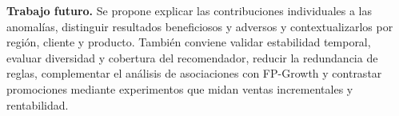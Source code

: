 \documentclass[11pt,a4paper]{article}
\begin{document}
\textbf{Trabajo futuro.} Se propone explicar las contribuciones individuales a las anomalías, distinguir resultados beneficiosos y adversos y contextualizarlos por región, cliente y producto. También conviene validar estabilidad temporal, evaluar diversidad y cobertura del recomendador, reducir la redundancia de reglas, complementar el análisis de asociaciones con FP-Growth y contrastar promociones mediante experimentos que midan ventas incrementales y rentabilidad.
\end{document}
